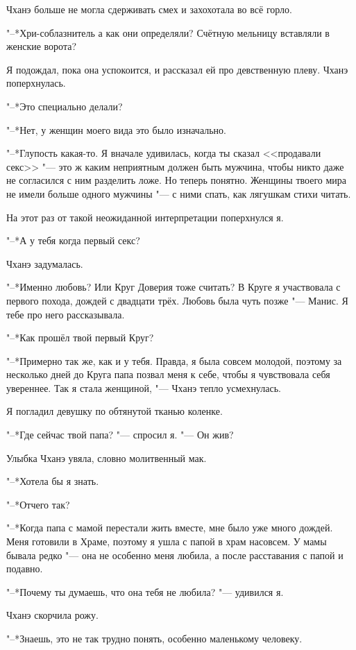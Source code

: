 \documentclass[a4paper,10pt]{book}
\newcommand{\ldotst}{\so{...}\xspace}
\begin{document}
Чханэ больше не могла сдерживать смех и захохотала во всё горло.

"--*Хри-соблазнитель\ldotst а как\ldotst они\ldotst определяли? Счётную 
мельницу 
вставляли в женские ворота?

Я подождал, пока она успокоится, и рассказал ей про девственную плеву. Чханэ 
поперхнулась.

"--*Это специально делали?

"--*Нет, у женщин моего вида это было изначально.

"--*Глупость какая-то. Я вначале удивилась, когда ты сказал <<продавали секс>> 
"--- это ж каким неприятным должен быть мужчина, чтобы никто даже не согласился 
с ним разделить ложе. Но теперь понятно. Женщины твоего мира не имели больше 
одного мужчины "--- с ними спать, как лягушкам стихи читать.

На этот раз от такой неожиданной интерпретации поперхнулся я.

"--*А у тебя когда первый секс?

Чханэ задумалась.

"--*Именно любовь? Или Круг Доверия тоже считать? В Круге я участвовала с 
первого похода, дождей с двадцати трёх. Любовь была чуть позже "--- Манис. Я 
тебе про него рассказывала.

"--*Как прошёл твой первый Круг?

"--*Примерно так же, как и у тебя. Правда, я была совсем молодой, поэтому за 
несколько дней до Круга папа позвал меня к себе, чтобы я чувствовала себя 
увереннее. Так я стала женщиной, "--- Чханэ тепло усмехнулась.

Я погладил девушку по обтянутой тканью коленке.

"--*Где сейчас твой папа? "--- спросил я. "--- Он жив?

Улыбка Чханэ увяла, словно молитвенный мак.

"--*Хотела бы я знать.

"--*Отчего так?

"--*Когда папа с мамой перестали жить вместе, мне было уже много дождей. Меня 
готовили в Храме, поэтому я ушла с папой в храм насовсем. У мамы бывала редко 
"--- она не особенно меня любила, а после расставания с папой и подавно.

"--*Почему ты думаешь, что она тебя не любила? "--- удивился я.

Чханэ скорчила рожу.

"--*Знаешь, это не так трудно понять, особенно маленькому человеку.
\end{document}
